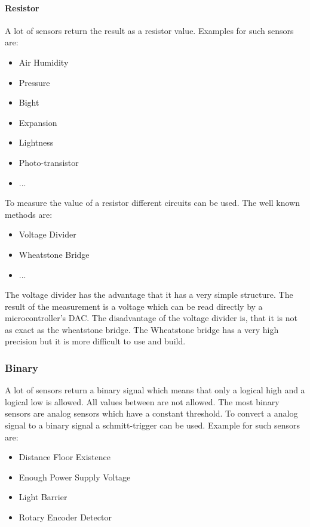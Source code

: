 \paragraph{Resistor}
A lot of sensors return the result as a resistor value.
Examples for such sensors are:
\begin{itemize}
\item Air Humidity
\item Pressure
\item Bight
\item Expansion
\item Lightness
\item Photo-transistor
\item ...
\end{itemize}
To measure the value of a resistor different circuits can be used.
The well known methods are:
\begin{itemize}
\item Voltage Divider
\item Wheatstone Bridge
\item ...
\end{itemize}
The voltage divider has the advantage that it has a very simple structure.
The result of the measurement is a voltage which can be read directly by a microcontroller's DAC.
The disadvantage of the voltage divider is, that it is not as exact as the wheatstone bridge.
The Wheatstone bridge has a very high precision but it is more difficult to use and build.


\subsubsection{Binary}
A lot of sensors return a binary signal which means that only a logical high and a logical low is allowed.
All values between are not allowed.
The most binary sensors are analog sensors which have a constant threshold.
To convert a analog signal to a binary signal a schmitt-trigger can be used.
Example for such sensors are:
\begin{itemize}
\item Distance
\subitem Floor Existence
\item Enough Power Supply Voltage
\item Light Barrier
\item Rotary Encoder Detector 
\end{itemize}


